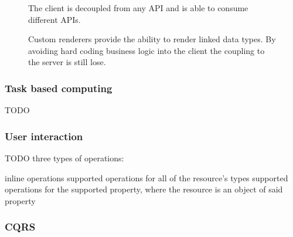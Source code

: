 \begin{figure}[!htb]
  \caption{The client is decoupled from any API and is able to consume different APIs.}
\end{figure}

\begin{figure}[!htb]
  \caption{Custom renderers provide the ability to render linked data types. By avoiding hard coding business logic into the client the coupling to the server is still lose.}
\end{figure}

\subsubsection{Task based computing}

TODO

\subsubsection{User interaction}

TODO three types of operations:

inline operations
supported operations for all of the resource's types
supported operations for the supported property, where the resource is an object of said property

\subsubsection{CQRS}
